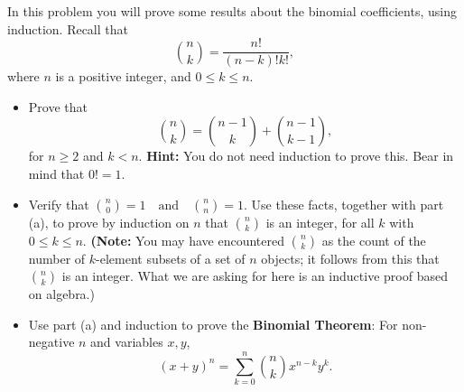 \documentclass[12pt]{article}
\newenvironment{problem}[2][Problem]{\begin{trivlist}
\item[\hskip \labelsep {\bfseries #1}\hskip \labelsep {\bfseries #2.}]}{\end{trivlist}}
\begin{document}
\begin{problem}{14}
In this problem you will prove some results about the binomial coefficients, using
induction. Recall that
\[
\binom{n}{k} = \frac{n!}{(n - k)!k!},
\]
where \( n \) is a positive integer, and \( 0 \leq k \leq n \).

\begin{itemize}
    \item[(a)] Prove that 
    \[
    \binom{n}{k} = \binom{n-1}{k} + \binom{n-1}{k-1},
    \]
    for \( n \geq 2 \) and \( k < n \). \textbf{Hint:} You do not need induction to prove this. Bear in mind
    that \( 0! = 1 \).

    \item[(b)] Verify that 
    $
    \binom{n}{0} = 1 \quad \text{and} \quad \binom{n}{n} = 1.
    $
    Use these facts, together with part (a), to prove
    by induction on \( n \) that \( \binom{n}{k} \) is an integer, for all \( k \) with \( 0 \leq k \leq n \). \textbf{(Note:} You
    may have encountered \( \binom{n}{k} \) as the count of the number of \( k \)-element subsets of a
    set of \( n \) objects; it follows from this that \( \binom{n}{k} \) is an integer. What we are asking
    for here is an inductive proof based on algebra.)
    
    \item[(c)] Use part (a) and induction to prove the \textbf{Binomial Theorem}: For non-negative
    \( n \) and variables \( x, y \),
    \[
    (x + y)^n = \sum_{k=0}^{n} \binom{n}{k} x^{n-k} y^k.
    \]
\end{itemize}

\end{problem}
\end{document}
